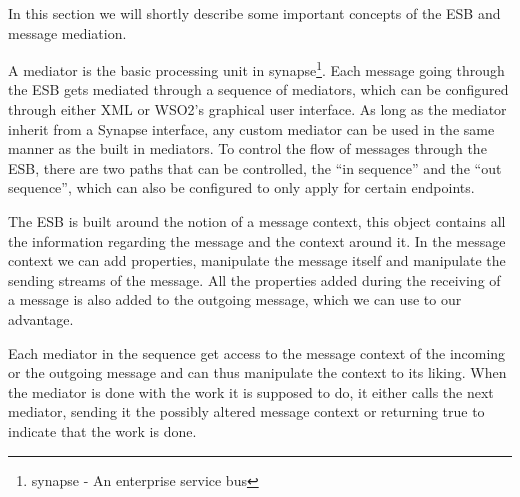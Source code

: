     In this section we will shortly describe some important concepts of the ESB and message mediation.

    A mediator is the basic processing unit in \gls{synapse}\footnote{\gls{synapse} - An enterprise service bus}. Each message going through the ESB gets mediated through a sequence of mediators, which can be configured through either XML or WSO2’s graphical user interface. As long as the mediator inherit from a Synapse interface, any custom mediator can be used in the same manner as the built in mediators. To control the flow of messages through the ESB, there are two paths that can be controlled, the “in sequence” and the “out sequence”, which can also be configured to only apply for certain endpoints.

    The ESB is built around the notion of a message context, this object contains all the information regarding the message and the context around it. In the message context we can add properties, manipulate the message itself and manipulate the sending streams of the message. All the properties added during the receiving of a message is also added to the outgoing message, which we can use to our advantage.

    Each mediator in the sequence get access to the message context of the incoming or the outgoing message and can thus manipulate the context to its liking. When the mediator is done with the work it is supposed to do, it either calls the next mediator, sending it the possibly altered message context or returning true to indicate that the work is done.

